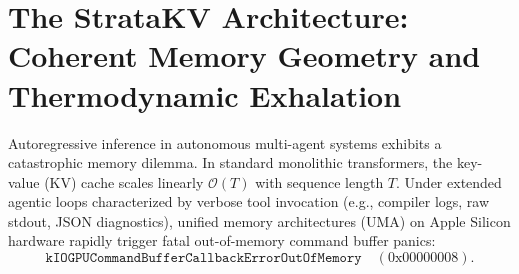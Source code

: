 
\section{The StrataKV Architecture: Coherent Memory Geometry and Thermodynamic Exhalation}
\label{sec:stratakv}

Autoregressive inference in autonomous multi-agent systems exhibits a catastrophic memory dilemma. In standard monolithic transformers, the key-value (KV) cache scales linearly $\mathcal{O}(T)$ with sequence length $T$. Under extended agentic loops characterized by verbose tool invocation (e.g., compiler logs, raw stdout, JSON diagnostics), unified memory architectures (UMA) on Apple Silicon hardware rapidly trigger fatal out-of-memory command buffer panics:
\begin{equation}
    \texttt{kIOGPUCommandBufferCallbackErrorOutOfMemory} \quad (0\text{x}00000008).
\end{equation}


